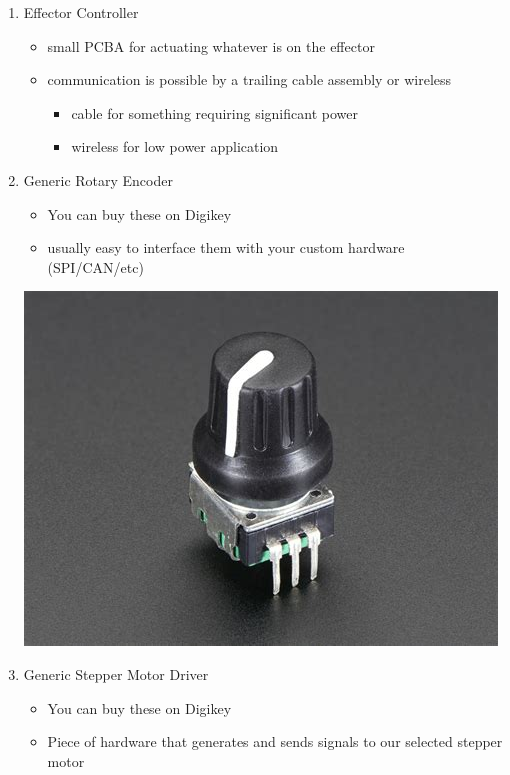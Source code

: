 \documentclass[11pt]{article}
\begin{document}
\begin{enumerate}
\item Effector Controller
\label{sec:org3dbc812}

\begin{itemize}
\item small PCBA for actuating whatever is on the effector
\item communication is possible by a trailing cable assembly or wireless
\begin{itemize}
\item cable for something requiring significant power
\item wireless for low power application
\end{itemize}
\end{itemize}

\item Generic Rotary Encoder
\label{sec:orgb611acc}

\begin{itemize}
\item You can buy these on Digikey
\item usually easy to interface them with your custom hardware (SPI/CAN/etc)
\end{itemize}

\begin{center}
\includegraphics[width=.9\linewidth]{Electronics_Modules/2022-07-18_13-48-01_screenshot.png}
\end{center}

\item Generic Stepper Motor Driver
\label{sec:org3393b9b}

\begin{itemize}
\item You can buy these on Digikey
\item Piece of hardware that generates and sends signals to our selected stepper motor
\end{itemize}


\end{enumerate}
\end{document}
